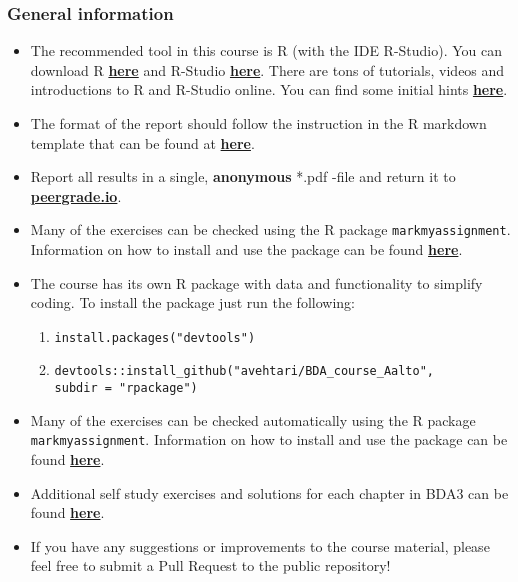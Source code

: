 
\subsubsection*{General information}

\begin{itemize}
\itemsep0em 
\item The recommended tool in this course is R (with the IDE R-Studio). You can download R \href{https://cran.r-project.org/}{\textbf{here}} and R-Studio \href{https://www.rstudio.com/products/rstudio/download/}{\textbf{here}}. There are tons of tutorials, videos and introductions to R and R-Studio online. You can find some initial hints \href{https://www.rstudio.com/online-learning/}{\textbf{here}}. 
\item  The format of the report should follow the instruction in the R markdown template that can be found at \href{https://raw.githubusercontent.com/avehtari/BDA_course_Aalto/master/templates/assignment_template.rmd}{\textbf{here}}. 
\item  Report all results in a single, {\bf anonymous} *.pdf -file and return it to \href{peergrade.io}{\textbf{peergrade.io}}. 
\item Many of the exercises can be checked using the R package \texttt{markmyassignment}. Information on how to install and use the package can be found \href{https://cran.r-project.org/web/packages/markmyassignment/vignettes/markmyassignment.html}{\textbf{here}}.
\item The course has its own R package with data and functionality to simplify coding. To install the package just run the following:
\begin{enumerate}
\item \texttt{install.packages("devtools")}
\item \texttt{devtools::install\_github("avehtari/BDA\_course\_Aalto", \\ subdir = "rpackage")}
\end{enumerate}
\item Many of the exercises can be checked automatically using the R package \\ \texttt{markmyassignment}. Information on how to install and use the package can be found \href{https://cran.r-project.org/web/packages/markmyassignment/vignettes/markmyassignment.html}{\textbf{here}}.
\item Additional self study exercises and solutions for each chapter in BDA3 can be found \href{http://www.stat.columbia.edu/~gelman/book/solutions3.pdf}{\textbf{here}}.
\item If you have any suggestions or improvements to the course material, please feel free to submit a Pull Request to the public repository!
\end{itemize}